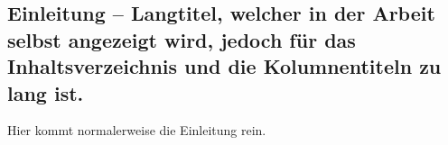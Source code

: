 \begin{showIntro}%
%
\chapter[Einleitung -- Kurztitel für das Inhaltsverzeichnis und die Kolumnentitel]{Einleitung -- Langtitel, welcher in der Arbeit selbst angezeigt wird, jedoch für das Inhaltsverzeichnis und die Kolumnentiteln zu lang ist.}%
\label{chap:Introduction}
%
Hier kommt normalerweise die Einleitung rein.
%
%
%
\end{showIntro}%
